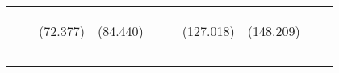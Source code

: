 \begin{tabular}{lccccccccc}
 & \begin{footnotesize}\end{footnotesize} & \begin{footnotesize}(72.377)\end{footnotesize} & \begin{footnotesize}(84.440)\end{footnotesize} & \begin{footnotesize}\end{footnotesize} & \begin{footnotesize}\end{footnotesize} & \begin{footnotesize}(127.018)\end{footnotesize} & \begin{footnotesize}(148.209)\end{footnotesize} & \begin{footnotesize}\end{footnotesize} & \begin{footnotesize}\end{footnotesize}\\
 & \begin{footnotesize}\end{footnotesize} & \begin{footnotesize}[1.000]\end{footnotesize} & \begin{footnotesize}[1.000]\end{footnotesize} & \begin{footnotesize}\end{footnotesize} & \begin{footnotesize}\end{footnotesize} & \begin{footnotesize}[1.000]\end{footnotesize} & \begin{footnotesize}[0.023]\end{footnotesize} & \begin{footnotesize}\end{footnotesize} & \begin{footnotesize}\end{footnotesize}\\
\noalign{\smallskip}\hline\end{tabular}\\

